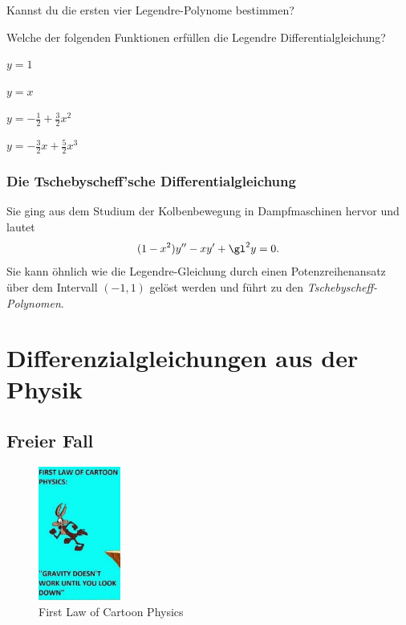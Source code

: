 \documentclass[%
draft,
11pt,%
twoside,%
titlepage,%
german,%
headsepline%
]{scrartcl}
\begin{document}
\begin{ueb}
Kannst du die ersten vier Legendre-Polynome bestimmen?
\end{ueb}

\begin{ueb}
Welche der folgenden Funktionen erf\"ullen die Legendre Differentialgleichung?

\begin{minipage}{0.3\textwidth}
\begin{enumeratea}
\item $y=1$
\item $y=x$
\end{enumeratea}
\end{minipage}
\begin{minipage}{0.4\textwidth}
\begin{enumeratea}
\setcounter{enumi}{2}
\item $y=-\frac{1}{2}+\frac{3}{2}x^2$
\item $y=-\frac{3}{2}x+\frac{5}{2}x^3$
\end{enumeratea}
\end{minipage}
\end{ueb}

\subsubsection{Die Tschebyscheff'sche Differentialgleichung}

Sie ging aus dem Studium der Kolbenbewegung in Dampfmaschinen hervor und lautet
$$(1-x^2)y''-xy'+\gl^2y=0.$$
Sie kann \"ohnlich wie die Legendre-Gleichung durch einen Potenzreihenansatz \"uber dem Intervall $(-1,1)$ gel\"ost werden und f\"uhrt zu den \emph{Tschebyscheff-Polynomen}.\\

\section{Differenzialgleichungen aus der Physik}
\subsection{Freier Fall}

\begin{figure}
\vspace{-35pt}
  \begin{center}
    \includegraphics[width=0.24\textwidth]{pictures/fall}
  \end{center}
\caption{First Law of Cartoon Physics}
\vspace{-35pt}
\end{figure}
\end{document}
